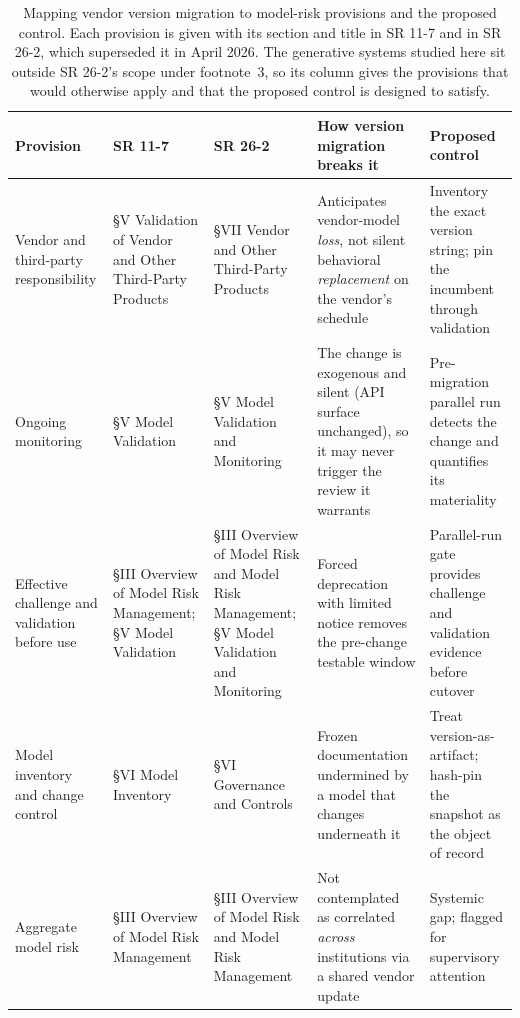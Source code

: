 \documentclass{ieeeaccess}
\begin{document}
\begin{table}[t]
\centering
\caption{Mapping vendor version migration to model-risk provisions and the proposed control. Each provision is given with its section and title in SR 11-7 and in SR 26-2, which superseded it in April 2026. The generative systems studied here sit outside SR 26-2's scope under footnote~3, so its column gives the provisions that would otherwise apply and that the proposed control is designed to satisfy.}
\label{tab:gov}
\small
\begin{tabular}{@{}>{\raggedright\arraybackslash}p{}>{\raggedright\arraybackslash}p{}>{\raggedright\arraybackslash}p{}>{\raggedright\arraybackslash}p{}>{\raggedright\arraybackslash}p{}@{}}
\toprule
Provision & SR 11-7 & SR 26-2 & How version migration breaks it & Proposed control \\
\midrule
Vendor and third-party responsibility & \S V Validation of Vendor and Other Third-Party Products & \S VII Vendor and Other Third-Party Products & Anticipates vendor-model \emph{loss}, not silent behavioral \emph{replacement} on the vendor's schedule & Inventory the exact version string; pin the incumbent through validation \\
\addlinespace
Ongoing monitoring & \S V Model Validation & \S V Model Validation and Monitoring & The change is exogenous and silent (API surface unchanged), so it may never trigger the review it warrants & Pre-migration parallel run detects the change and quantifies its materiality \\
\addlinespace
Effective challenge and validation before use & \S III Overview of Model Risk Management; \S V Model Validation & \S III Overview of Model Risk and Model Risk Management; \S V Model Validation and Monitoring & Forced deprecation with limited notice removes the pre-change testable window & Parallel-run gate provides challenge and validation evidence before cutover \\
\addlinespace
Model inventory and change control & \S VI Model Inventory & \S VI Governance and Controls & Frozen documentation undermined by a model that changes underneath it & Treat version-as-artifact; hash-pin the snapshot as the object of record \\
\addlinespace
Aggregate model risk & \S III Overview of Model Risk Management & \S III Overview of Model Risk and Model Risk Management & Not contemplated as correlated \emph{across} institutions via a shared vendor update & Systemic gap; flagged for supervisory attention \\
\bottomrule
\end{tabular}
\end{table}
\end{document}
